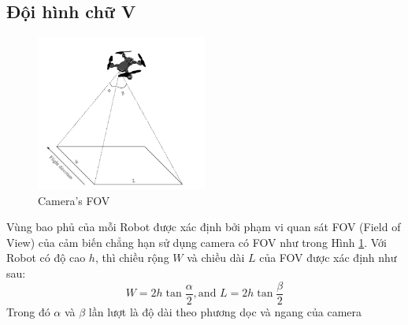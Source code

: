 \subsection{Đội hình chữ V}
\label{sec:VTG}
\begin{figure}[hbtp]
    \centering
    \includegraphics[width=0.5\textwidth]{chapter3/image/FOVDr.pdf}
    \caption{Camera's FOV}
    \label{fig:FOVmodel}
\end{figure}

Vùng bao phủ của mỗi Robot được xác định bởi phạm vi quan sát FOV (Field of View) của cảm biến chẳng hạn sử dụng camera có FOV như trong Hình \ref{fig:FOVmodel}. Với Robot có độ cao $h$, thì chiều rộng $W$ và chiều dài $L$ của FOV được xác định như sau:
\begin{equation}
    W = 2h\tan \frac{\alpha}{2}, \text{and }L = 2h \tan \frac{\beta}{2}
\label{eq:FOV}
\end{equation}
Trong đó $\alpha$ và $\beta$ lần lượt là độ dài theo phương dọc và ngang của camera

